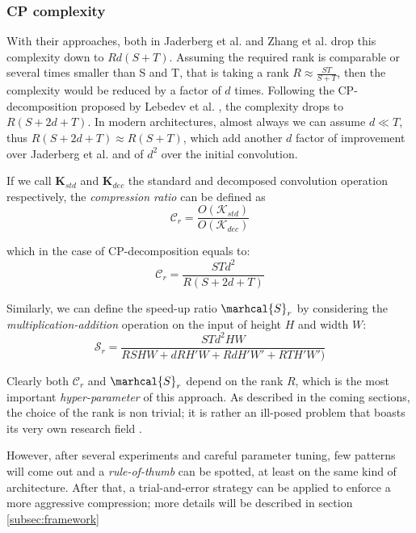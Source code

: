 \subsubsection{CP complexity}

With their approaches, both in Jaderberg et al.\parencite{jaderberg2014} and Zhang et al. \parencite{zhang2015SVD} drop this complexity down to $Rd(S+T)$. Assuming the required rank is comparable or several times smaller than S and T, that is taking a rank $R\approx \frac{ST}{S+T}$, then the complexity would be reduced by a factor of $d$ times. 
\newline 
Following the CP-decomposition proposed by Lebedev et al. \parencite{lebedev2014}, the complexity drops to $R(S+2d+T)$. In modern architectures, almost always we can assume $d\ll T$, thus $R(S+2d+T) \approx R(S+T)$,  which add another $d$ factor of improvement over Jaderberg et al. and of $d^2$ over the initial convolution. 


If we call $\mathbf{K}_{std}$ and $\mathbf{K}_{dec}$ the standard and decomposed convolution operation respectively,  the \emph{compression ratio} can be defined as
\begin{equation}
    \mathbf{\mathcal{C}}_r = \frac{O(\mathcal{K}_{std})}{O(\mathcal{K}_{dec})}
\end{equation}

which in the case of CP-decomposition equals to: 
\begin{equation}
    \mathcal{C}_r = \frac{STd^2}{R(S+2d+T)}    
\end{equation}

Similarly, we can define the speed-up ratio $\marhcal{S}_r$ by considering the \emph{multiplication-addition} operation on the input of height $H$ and width $W$: 
\begin{equation}
    \mathcal{S}_r = \frac{STd^2HW}{RSHW + dRH'W + RdH'W'+ RTH'W')}    
\end{equation}


Clearly both $\mathcal{C}_r$ and $\marhcal{S}_r$ depend on the rank $R$, which is the most important \emph{hyper-parameter} of this approach. As described in the coming sections, the choice of the rank is non trivial; it is rather an ill-posed problem that boasts its very own research field \parencite{rank-hard1}. 

However, after several experiments and careful parameter tuning, few patterns will come out and a \emph{rule-of-thumb} can be spotted, at least on the same kind of architecture. After that, a trial-and-error strategy can be applied to enforce a more aggressive compression; more details will be described in section \ref{subsec:framework}

